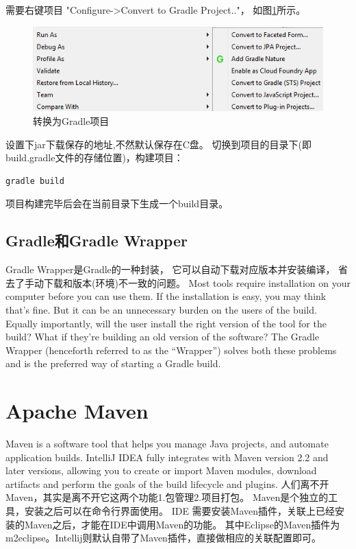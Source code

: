 \documentclass{book}
\begin{document}
需要右键项目 "Configure->Convert to Gradle Project.."，
如图\ref{code:ConvertToGradleProject}所示。

\begin{figure}[htbp]
	\centering
	\includegraphics[scale=0.6]{ConvertToGradleProject.png}
	\caption{转换为Gradle项目}
	\label{code:ConvertToGradleProject}
\end{figure}

设置下jar下载保存的地址,不然默认保存在C盘。
切换到项目的目录下(即build.gradle文件的存储位置)，构建项目：

\begin{lstlisting}[language=Bash]
gradle build
\end{lstlisting}

项目构建完毕后会在当前目录下生成一个build目录。

\subsection{Gradle和Gradle Wrapper}

Gradle Wrapper是Gradle的一种封装，
它可以自动下载对应版本并安装编译，
省去了手动下载和版本(环境)不一致的问题。
Most tools require installation on your computer before you can use them. 
If the installation is easy, you may think that’s fine. 
But it can be an unnecessary burden on the users of the build. 
Equally importantly, will the user install the right version of the tool for the build? 
What if they’re building an old version of the software?
The Gradle Wrapper (henceforth referred to as the “Wrapper”) 
solves both these problems and is the preferred way of starting a Gradle build.

\section{Apache Maven}

Maven is a software tool that helps you manage Java projects, 
and automate application builds. IntelliJ IDEA fully integrates with Maven version 2.2 and later versions, 
allowing you to create or import Maven modules, download artifacts and perform the goals 
of the build lifecycle and plugins.
人们离不开Maven，其实是离不开它这两个功能1.包管理2.项目打包。
Maven是个独立的工具，安装之后可以在命令行界面使用。
IDE 需要安装Maven插件，关联上已经安装的Maven之后，才能在IDE中调用Maven的功能。
其中Eclipse的Maven插件为m2eclipse。Intellij则默认自带了Maven插件，直接做相应的关联配置即可。
\end{document}

